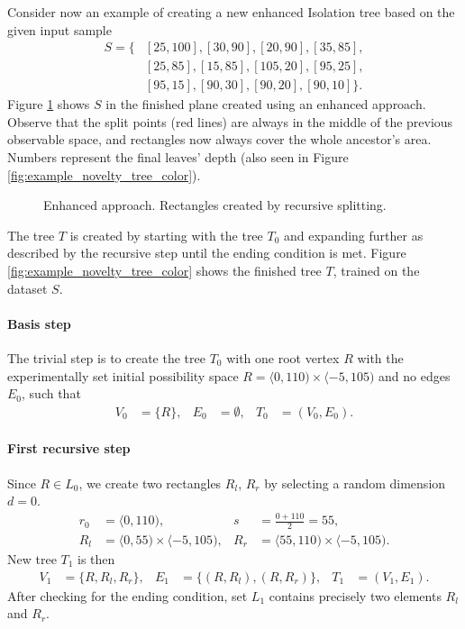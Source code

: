 \begin{example}
\label{example:novelty_tree_create}
Consider now an example of creating a new enhanced Isolation tree based on the given input sample
\begin{align*}
    S = \{&[25,100],[30,90],[20,90],[35,85],\\
    &[25,85],[15,85],[105,20],[95,25], \\
    &[95,15],[90,30],[90,20],[90,10]\}.
\end{align*}
Figure \ref{fig:example_novelty_gnu} shows $S$ in the finished plane created using an enhanced approach. Observe that the split points (red lines) are always in the middle of the previous observable space, and rectangles now always cover the whole ancestor's area. Numbers represent the final leaves' depth (also seen in Figure \ref{fig:example_novelty_tree_color}).

\begin{figure}[htbp]
\centering

\caption{Enhanced approach. Rectangles created by recursive splitting.}
\label{fig:example_novelty_gnu}
\end{figure}

The tree $T$ is created by starting with the tree $T_0$ and expanding further as described by the recursive step until the ending condition is met.
Figure \ref{fig:example_novelty_tree_color} shows the finished tree $T$, trained on the dataset $S$.

\paragraph{Basis step} 
The trivial step is to create the tree $T_0$ with one root vertex $R$ with the experimentally set initial possibility space  $R= \langle 0,110) \times \langle -5,105)$ and no edges $E_0$, such that
    \begin{align*}
        V_0 &= \{R\},&
        E_0 &= \emptyset,&
        T_0 &= (V_0, E_0).
    \end{align*}

\paragraph{First recursive step}
     Since $R \in L_0$, we create two rectangles $R_l$, $R_r$ by selecting a random dimension $d=0$.
    \begin{align*}
        r_0 &= \langle 0, 110), &
        s &= \frac{0 + 110}{2} = 55, \\
        R_l &= \langle 0, 55) \times \langle -5,105), &
        R_r &= \langle 55, 110) \times \langle -5,105).
    \end{align*}
     New tree $T_1$ is then
    \begin{align*}
    V_1 &= \{R, R_l, R_r\}, &
    E_1 &= \{(R, R_l), (R, R_r)\}, &
    T_1 &= (V_1, E_1).
    \end{align*}
    After checking for the ending condition, set $L_1$ contains precisely two elements $R_l$ and $R_r$.
     

\end{example}
